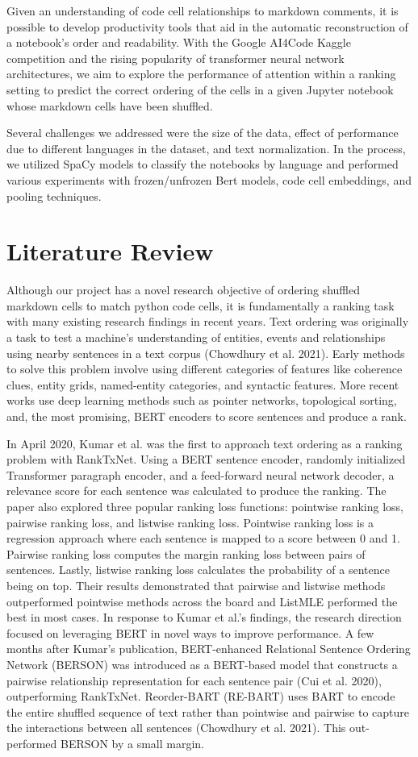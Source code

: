 \documentclass[conference]{IEEEtran}
\begin{document}
Given an understanding of code cell relationships to markdown comments, it is possible to develop productivity tools that aid in the automatic reconstruction of a notebook's order and readability. With the Google AI4Code Kaggle competition and the rising popularity of transformer neural network architectures, we aim to explore the performance of attention within a ranking setting to predict the correct ordering of the cells in a given Jupyter notebook whose markdown cells have been shuffled.

Several challenges we addressed were the size of the data, effect of performance due to different languages in the dataset, and text normalization. In the process, we utilized SpaCy models to classify the notebooks by language and performed various experiments with frozen/unfrozen Bert models, code cell embeddings, and pooling techniques.


\section{Literature Review}
Although our project has a novel research objective of ordering shuffled markdown cells to match python code cells, it is fundamentally a ranking task with many existing research findings in recent years. Text ordering was originally a task to test a machine’s understanding of entities, events and relationships using nearby sentences in a text corpus (Chowdhury et al. 2021). Early methods to solve this problem involve using different categories of features like coherence clues, entity grids, named-entity categories, and syntactic features. More recent works use deep learning methods such as pointer networks, topological sorting, and, the most promising, BERT encoders to score sentences and produce a rank.

In April 2020, Kumar et al. was the first to approach text ordering as a ranking problem with RankTxNet. Using a BERT sentence encoder, randomly initialized Transformer paragraph encoder, and a feed-forward neural network decoder, a relevance score for each sentence was calculated to produce the ranking. The paper also explored three popular ranking loss functions: pointwise ranking loss, pairwise ranking loss, and listwise ranking loss. Pointwise ranking loss is a regression approach where each sentence is mapped to a score between 0 and 1. Pairwise ranking loss computes the margin ranking loss between pairs of sentences. Lastly, listwise ranking loss calculates the probability of a sentence being on top. Their results demonstrated that pairwise and listwise methods outperformed pointwise methods across the board and ListMLE performed the best in most cases. In response to Kumar et al.’s findings, the research direction focused on leveraging BERT in novel ways to improve performance. A few months after Kumar’s publication, BERT-enhanced Relational Sentence Ordering Network (BERSON) was introduced as a BERT-based model that constructs a pairwise relationship representation for each sentence pair (Cui et al. 2020), outperforming RankTxNet. Reorder-BART (RE-BART) uses BART to encode the entire shuffled sequence of text rather than pointwise and pairwise to capture the interactions between all sentences (Chowdhury et al. 2021). This out-performed BERSON by a small margin.
\end{document}
